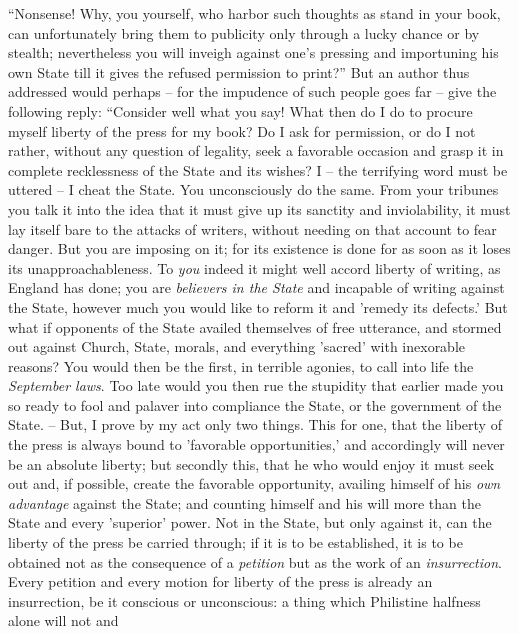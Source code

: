 ``Nonsense! Why, you yourself, who harbor such thoughts as stand in your 
book, can unfortunately bring them to publicity only through a lucky chance or 
by stealth; nevertheless you will inveigh against one's pressing and 
importuning his own State till it gives the refused permission to print?'' 
But an author thus addressed would perhaps -- for the impudence of such people 
goes far -- give the following reply: ``Consider well what you say! What then 
do I do to procure myself liberty of the press for my book? Do I ask for 
permission, or do I not rather, without any question of legality, seek a 
favorable occasion and grasp it in complete recklessness of the State and its 
wishes? I -- the terrifying word must be uttered -- I cheat the State. You 
unconsciously do the same. From your tribunes you talk it into the idea that 
it must give up its sanctity and inviolability, it must lay itself bare to the 
attacks of writers, without needing on that account to fear danger. But you 
are imposing on it; for its existence is done for as soon as it loses its 
unapproachableness. To \textit{you} indeed it might well accord liberty of 
writing, as England has done; you are \textit{believers in the State} and 
incapable of writing against the State, however much you would like to reform 
it and 'remedy its defects.' But what if opponents of the State availed 
themselves of free utterance, and stormed out against Church, State, morals, 
and everything 'sacred' with inexorable reasons? You would then be the first, 
in terrible agonies, to call into life the \textit{September laws}. Too late 
would you then rue the stupidity that earlier made you so ready to fool and 
palaver into compliance the State, or the government of the State. -- But, I 
prove by my act only two things. This for one, that the liberty of the press 
is always bound to 'favorable opportunities,' and accordingly will never be an 
absolute liberty; but secondly this, that he who would enjoy it must seek out 
and, if possible, create the favorable opportunity, availing himself of his 
\textit{own advantage} against the State; and counting himself and his will 
more than the State and every 'superior' power. Not in the State, but only 
against it, can the liberty of the press be carried through; if it is to be 
established, it is to be obtained not as the consequence of a 
\textit{petition} but as the work of an \textit{insurrection}. Every petition 
and every motion for liberty of the press is already an insurrection, be it 
conscious or unconscious: a thing which Philistine halfness alone will not and 
